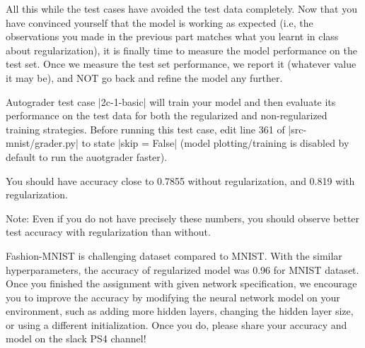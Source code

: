 \item {}
All this while the test cases have avoided the test data completely. Now that
you have convinced yourself that the model is working as expected (i.e, the
observations you made in the previous part matches what you learnt in class
about regularization), it is finally time to measure the model performance on
the test set. Once we measure the test set performance, we report it (whatever
value it may be), and NOT go back and refine the model any further.

Autograder test case |2c-1-basic| will train your model and then evaluate its performance on the test data for both the regularized and non-regularized training strategies.  Before running this test case, edit line 361 of |src-mnist/grader.py| to state |skip = False| (model plotting/training is disabled by default to run the auotgrader faster).

You should have accuracy close to 0.7855 without regularization, and 0.819 with regularization.

Note: Even if you do not have precisely these numbers, you should observe better test accuracy with regularization than without.

Fashion-MNIST is challenging dataset compared to MNIST. With the similar hyperparameters, the accuracy of regularized model was 0.96 for MNIST dataset. Once you finished the assignment with given network specification, we encourage you to improve the accuracy by modifying the neural network model on your environment, such as adding more hidden layers, changing the hidden layer size, or using a different initialization. Once you do, please share your accuracy and model on
the slack PS4 channel!
